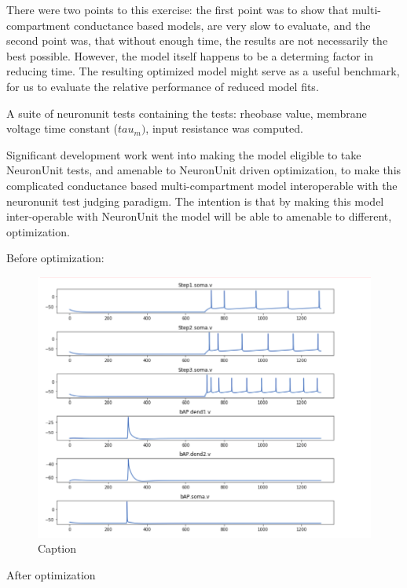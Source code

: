 There were two points to this exercise: the first point was to show that multi-compartment conductance based models, are very slow to evaluate, and the second point was, that without enough time, the results are not necessarily the best possible. However, the model itself happens to be a determing factor in reducing time. The resulting optimized model might serve as a useful benchmark, for us to evaluate the relative performance of reduced model fits. 

A suite of neuronunit tests containing the tests: rheobase value, membrane voltage time constant ($tau_{m})$, input resistance was computed. 

Significant development work went into making the model eligible to take NeuronUnit tests, and amenable to NeuronUnit driven optimization, to make this complicated conductance based multi-compartment model interoperable with the neuronunit test judging paradigm. The intention is that by making this model inter-operable with NeuronUnit the model will be able to amenable to different, optimization. 

Before optimization:
\begin{figure}
    \centering
    \includegraphics{figures/l5pc_before_opt}
    \caption{Caption}
    \label{fig:my_label}
\end{figure}
After optimization

